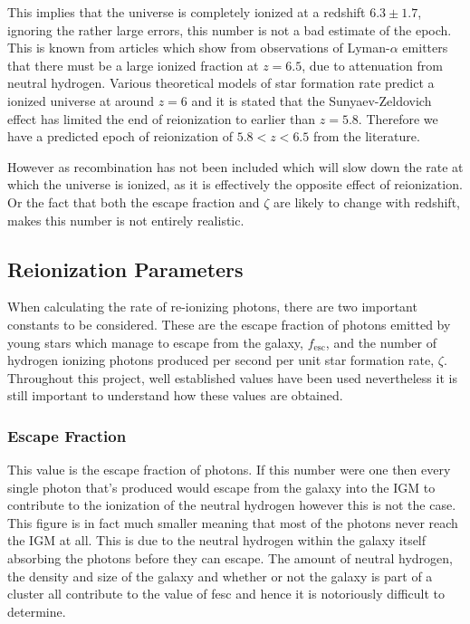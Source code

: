 	This implies that the universe is completely ionized at a redshift $6.3\pm1.7$, ignoring the rather large errors, this number is not a bad estimate of the epoch. This is known from articles which show from observations of Lyman-$\alpha$ emitters that there must be a large ionized fraction at $z=6.5$, due to attenuation from neutral hydrogen\cite{Ota:arXiv0707.1561}. Various theoretical models of star formation rate predict a ionized universe at around $z=6$ and it is stated that the Sunyaev-Zeldovich effect has limited the end of reionization to earlier than $z=5.8$\cite{2012MNRAS.423..862K}. Therefore we have a predicted epoch of reionization of $5.8<z<6.5$ from the literature.

	However as recombination has not been included which will slow down the rate at which the universe is ionized, as it is effectively the opposite effect of reionization. Or the fact that both the escape fraction and $\zeta$ are likely to change with redshift, makes this number is not entirely realistic.

	\subsection{Reionization Parameters} %
	\label{sub:reionization_parameters}
		When calculating the rate of re-ionizing photons, there are two important constants to be considered. These are the escape fraction of photons emitted by young stars which manage to escape from the galaxy, $f_\text{esc}$, and the number of hydrogen ionizing photons produced per second per unit star formation rate, $\zeta$. Throughout this project, well established values have been used nevertheless it is still important to understand how these values are obtained.

		\subsubsection{Escape Fraction} %
		\label{sub:escape_fraction}
			This value is the escape fraction of photons. If this number were one then every single photon that's produced would escape from the galaxy into the IGM to contribute to the ionization of the neutral hydrogen however this is not the case. This figure is in fact much smaller meaning that most of the photons never reach the IGM at all. This is due to the neutral hydrogen within the galaxy itself absorbing the photons before they can escape. The amount of neutral hydrogen, the density and size of the galaxy and whether or not the galaxy is part of a cluster all contribute to the value of fesc and hence it is notoriously difficult to determine.


